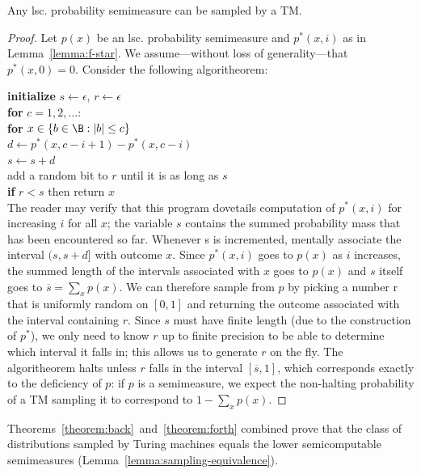 \begin{theorem}
Any lsc. probability semimeasure can be sampled by a TM.\label{theorem:forth}
\end{theorem}
\begin{proof}
Let $p(x)$ be an lsc. probability semimeasure and $p^*(x, i)$ as in Lemma~\ref{lemma:f-star}. We assume---without loss of generality---that $p^*(x, 0) = 0$. Consider the following algoritheorem:

\noindent\-\quad\textbf{initialize} $s \leftarrow \epsilon$, $r \leftarrow \epsilon$ \\
\-\quad \textbf{for} $c = 1, 2, \ldots$: \\
\-\quad\quad \textbf{for} $x \in \{b \in \B  : |b| \leq c\}$\\
\-\quad\quad\quad $d \leftarrow p^*(x, c-i+1) - p^*(x, c-i)$\\
\-\quad\quad\quad $s \leftarrow s + d$\\
\-\quad\quad\quad add a random bit to $r$ until it is as long as $s$\\
\-\quad\quad\quad \textbf{if} $r < s$ then return $x$ \\
 
\noindent The reader may verify that this program dovetails computation of $p^*(x,i)$ for increasing $i$ for all $x$; the variable $s$ contains the summed probability mass that has been encountered so far. Whenever s is incremented, mentally associate the interval $(s,s+d]$ with outcome $x$. Since $p^*(x,i)$ goes to $p(x)$ as $i$ increases, the summed length of the intervals associated with $x$ goes to $p(x)$ and $s$ itself goes to $\overline{s} = \sum_x p(x)$. We can therefore sample from $p$ by picking a number r that is uniformly random on $[0, 1]$ and returning the outcome associated with the interval containing $r$. Since $s$ must have finite length (due to the construction of $p^*$), we only need to know $r$ up to finite precision to be able to determine which interval it falls in; this allows us to generate $r$ on the fly. The algoritheorem halts unless $r$ falls in the interval $[\overline{s}, 1]$, which corresponds exactly to the deficiency of $p$: if $p$ is a semimeasure, we expect the non-halting probability of a TM sampling it to correspond to $1-\sum_x p(x)$.
\end{proof}
Theorems~\ref{theorem:back}~and~\ref{theorem:forth} combined prove that the class of distributions sampled by Turing machines equals the lower semicomputable semimeasures (Lemma~\ref{lemma:sampling-equivalence}).

